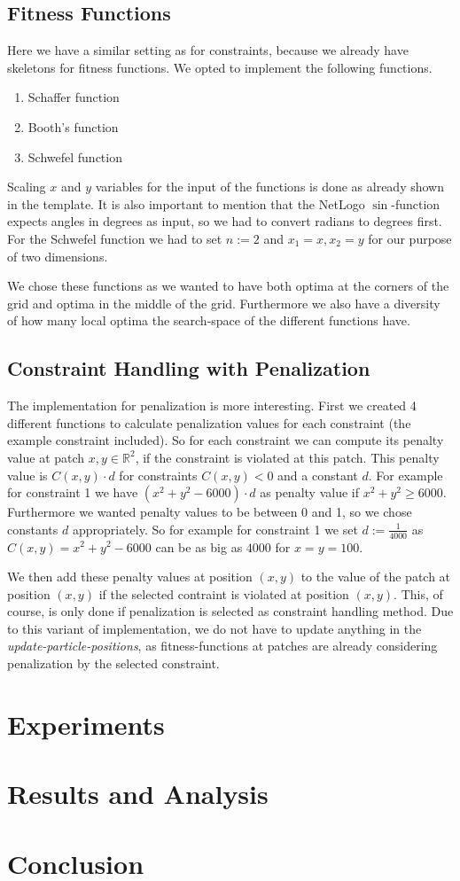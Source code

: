\documentclass[12pt]{article}
\begin{document}
\subsection{Fitness Functions}
Here we have a similar setting as for constraints, because we already have skeletons for fitness functions.
We opted to implement the following functions.
\begin{enumerate}
        \item Schaffer function
        \item Booth's function
        \item Schwefel function
\end{enumerate}
Scaling $x$ and $y$ variables for the input of the functions is done as already shown in the template.
It is also important to mention that the NetLogo $\sin$-function expects angles in degrees as input, so we had to convert radians to degrees first.
For the Schwefel function we had to set $n:=2$ and $x_1=x,x_2=y$ for our purpose of two dimensions.

We chose these functions as we wanted to have both optima at the corners of the grid and optima in the middle of the grid.
Furthermore we also have a diversity of how many local optima the search-space of the different functions have.
\subsection{Constraint Handling with Penalization}
The implementation for penalization is more interesting.
First we created 4 different functions to calculate penalization values for each constraint (the example constraint included).
So for each constraint we can compute its penalty value at patch $x,y\in\mathbb{R}^2$, if the constraint is violated at this patch.
This penalty value is $C(x,y)\cdot d$ for constraints $C(x,y)<0$ and a constant $d$.
For example for constraint 1 we have $(x^2+y^2-6000)\cdot d$ as penalty value if $x^2+y^2\ge 6000$.
Furthermore we wanted penalty values to be between 0 and 1, so we chose constants $d$ appropriately.
So for example for constraint 1 we set $d:=\frac{1}{4000}$ as $C(x,y)=x^2+y^2-6000$ can be as big as $4000$ for $x=y=100$.

We then add these penalty values at position $(x,y)$ to the value of the patch at position $(x,y)$ if the selected contraint is violated at position $(x,y)$.
This, of course, is only done if penalization is selected as constraint handling method.
Due to this variant of implementation, we do not have to update anything in the \textit{update-particle-positions}, as fitness-functions at patches are already considering penalization by the selected constraint.
\section{Experiments}

\section{Results and Analysis}

\section{Conclusion}





\end{document}
